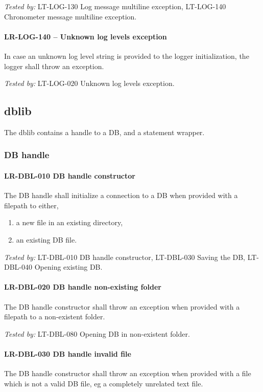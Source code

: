 \textit{Tested by: } LT-LOG-130 Log message multiline exception,
LT-LOG-140 Chronometer message multiline exception.

\paragraph{LR-LOG-140 -- Unknown log levels exception}
In case an unknown log level string is provided to the logger initialization,
the logger shall throw an exception.

\textit{Tested by: } LT-LOG-020 Unknown log levels exception.

\subsection{db\textunderscore lib}
The db\textunderscore lib contains a handle to a \gls{DB}, and a statement
wrapper.

\subsubsection{DB handle}
\paragraph{LR-DBL-010 DB handle constructor}
The DB handle shall initialize a connection to a DB when provided
with a filepath to either,
\begin{enumerate}
\item a new file in an existing directory,
\item an existing DB file.
\end{enumerate}

\textit{Tested by: } LT-DBL-010 DB handle constructor,
LT-DBL-030 Saving the DB,
LT-DBL-040 Opening existing DB.

\paragraph{LR-DBL-020 DB handle non-existing folder}
The DB handle constructor shall throw an exception when provided with a filepath
to a non-existent folder.

\textit{Tested by: } LT-DBL-080 Opening DB in non-existent folder.

\paragraph{LR-DBL-030 DB handle invalid file}
The DB handle constructor shall throw an exception when provided with a
file which is not a valid DB file, eg a completely unrelated text file.

